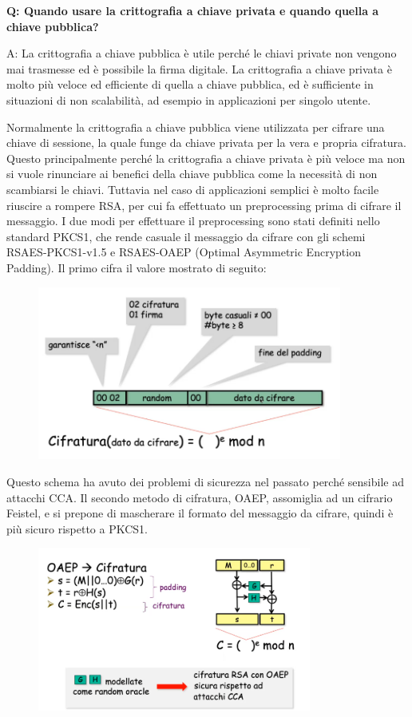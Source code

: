 \begin{mdframed}[backgroundcolor=gray!20,shadow=false]
\textbf{Q: Quando usare la crittografia a chiave privata e quando quella a chiave pubblica?}

A: La crittografia a chiave pubblica è utile perché le chiavi private non vengono mai trasmesse ed è possibile la firma digitale. La crittografia a chiave privata è molto più veloce ed efficiente di quella a chiave pubblica, ed è sufficiente in situazioni di non scalabilità, ad esempio in applicazioni per singolo utente.
\end{mdframed}

Normalmente la crittografia a chiave pubblica viene utilizzata per cifrare una chiave di sessione, la quale funge da chiave privata per la vera e propria cifratura. Questo principalmente perché la crittografia a chiave privata è più veloce ma non si vuole rinunciare ai benefici della chiave pubblica come la necessità di non scambiarsi le chiavi. Tuttavia nel caso di applicazioni semplici è molto facile riuscire a rompere RSA, per cui fa effettuato un preprocessing prima di cifrare il messaggio. I due modi per effettuare il preprocessing sono stati definiti nello standard PKCS1, che rende casuale il messaggio da cifrare con gli schemi RSAES-PKCS1-v1.5 e RSAES-OAEP (Optimal Asymmetric Encryption Padding). Il primo cifra il valore mostrato di seguito:

\begin{figure}[htb!]
    \centering
    \includegraphics[width=10cm]{./Images/cap1/1.48.png}
\end{figure} 

Questo schema ha avuto dei problemi di sicurezza nel passato perché sensibile ad attacchi CCA. Il secondo metodo di cifratura, OAEP, assomiglia ad un cifrario Feistel, e si prepone di mascherare il formato del messaggio da cifrare, quindi è più sicuro rispetto a PKCS1.

\begin{figure}[htb!]
    \centering
    \includegraphics[width=9cm]{./Images/cap1/1.49.png}
\end{figure} 

